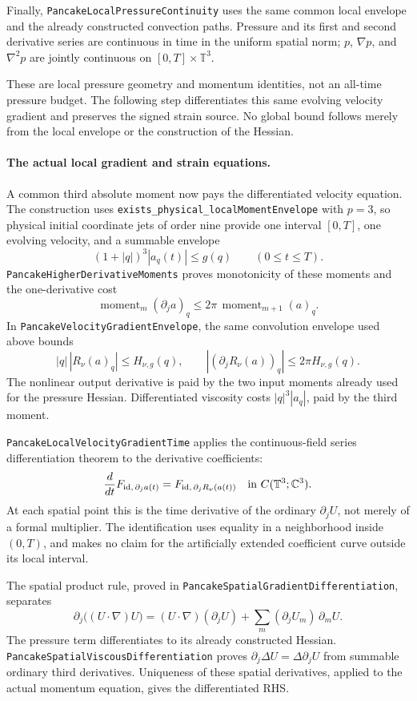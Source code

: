 \documentclass[11pt]{article}
\theoremstyle{definition}
\begin{document}
Finally, \texttt{PancakeLocalPressureContinuity} uses the same common
local envelope and the already constructed convection paths.
Pressure and its first and second derivative series are continuous in
time in the uniform spatial norm; $p$, $\nabla p$, and $\nabla^2p$ are
jointly continuous on $[0,T]\times\mathbb T^3$.

These are local pressure geometry and momentum identities, not an
all-time pressure budget. The following step differentiates this same
evolving velocity gradient and preserves the signed strain source.
No global bound follows merely from the local envelope or the
construction of the Hessian.

\paragraph{The actual local gradient and strain equations.}
A common third absolute moment now pays the differentiated velocity
equation. The construction uses
\texttt{exists\_physical\_localMomentEnvelope} with $p=3$, so physical
initial coordinate jets of order nine provide one interval $[0,T]$,
one evolving velocity, and a summable envelope
\[
 (1+|q|)^3|a_q(t)|\le g(q)\qquad(0\le t\le T).
\]
\texttt{PancakeHigherDerivativeMoments} proves monotonicity of these
moments and the one-derivative cost
\[
 \operatorname{moment}_m(\partial_j a)_q
 \le 2\pi\,\operatorname{moment}_{m+1}(a)_q.
\]
In \texttt{PancakeVelocityGradientEnvelope}, the same convolution
envelope used above bounds
\[
 |q|\,|R_\nu(a)_q|\le H_{\nu,g}(q),\qquad
 |(\partial_j R_\nu(a))_q|\le 2\pi H_{\nu,g}(q).
\]
The nonlinear output derivative is paid by the two input moments
already used for the pressure Hessian. Differentiated viscosity
costs $|q|^3|a_q|$, paid by the third moment.

\texttt{PancakeLocalVelocityGradientTime} applies the continuous-field
series differentiation theorem to the derivative coefficients:
\[
 \frac{d}{dt}F_{\mathrm{id},\,\partial_j a(t)}
   =F_{\mathrm{id},\,\partial_j R_\nu(a(t))}
       \quad\hbox{in }C(\mathbb T^3;\mathbb C^3).
\]
At each spatial point this is the time derivative of the ordinary
$\partial_j U$, not merely of a formal multiplier. The identification
uses equality in a neighborhood inside $(0,T)$, and makes no claim for
the artificially extended coefficient curve outside its local interval.

The spatial product rule, proved in
\texttt{PancakeSpatialGradientDifferentiation}, separates
\[
 \partial_j\bigl((U\cdot\nabla)U\bigr)
  =(U\cdot\nabla)(\partial_jU)
       +\sum_m(\partial_jU_m)\,\partial_m U.
\]
The pressure term differentiates to its already constructed Hessian.
\texttt{PancakeSpatialViscousDifferentiation} proves
$\partial_j\Delta U=\Delta\partial_jU$ from summable ordinary third
derivatives. Uniqueness of these spatial derivatives, applied to the
actual momentum equation, gives the differentiated RHS.
\end{document}
